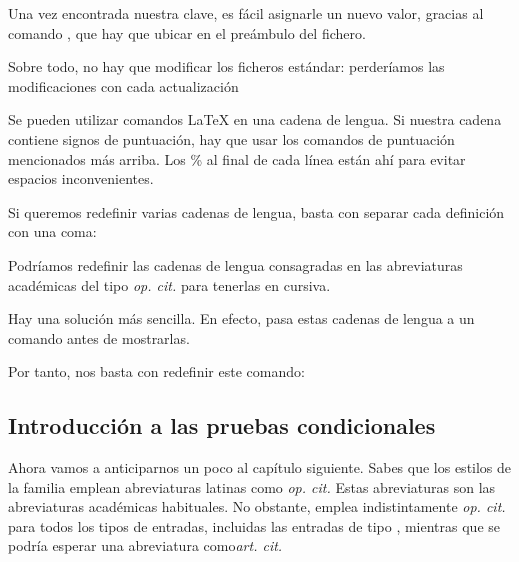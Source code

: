    Una vez encontrada nuestra clave, es fácil asignarle un nuevo valor, gracias al comando , que hay que ubicar en el preámbulo del fichero.
    
    \begin{attention}
    Sobre todo, no hay que modificar los ficheros estándar: perderíamos las modificaciones con cada actualización
    \end{attention}
    
    \begin{latexcode}
    \end{latexcode}

    Se pueden utilizar comandos \LaTeX{} en una cadena de lengua. Si nuestra cadena contiene signos de puntuación, hay que usar los comandos de puntuación mencionados más arriba. Los \% al final de cada línea están ahí para evitar espacios inconvenientes.
    
    Si queremos redefinir varias cadenas de lengua, basta con separar cada definición con una coma:
    
    \begin{latexcode}
    \end{latexcode}


\begin{plusloins}
Podríamos redefinir las cadenas de lengua consagradas en las abreviaturas académicas del tipo \emph{op. cit.} para tenerlas en cursiva. 

Hay una solución más sencilla\label{mkibid}. En efecto,  pasa estas cadenas de lengua a un comando  antes de mostrarlas.

Por tanto, nos basta con redefinir este comando:

\begin{latexcode}
\renewcommand{\mkibid}[1]{\emph{#1}}
\end{latexcode}

\end{plusloins}

\subsection{Introducción a las pruebas condicionales}\label{opcit}

Ahora vamos a anticiparnos un poco al capítulo siguiente.
Sabes que los estilos de la familia  emplean abreviaturas latinas como \emph{op. cit.}
Estas abreviaturas son las abreviaturas académicas habituales. No obstante,    emplea indistintamente \emph{op. cit.} para todos los tipos de entradas, incluidas las entradas de tipo , mientras que se podría esperar una abreviatura como\emph{art. cit.}

